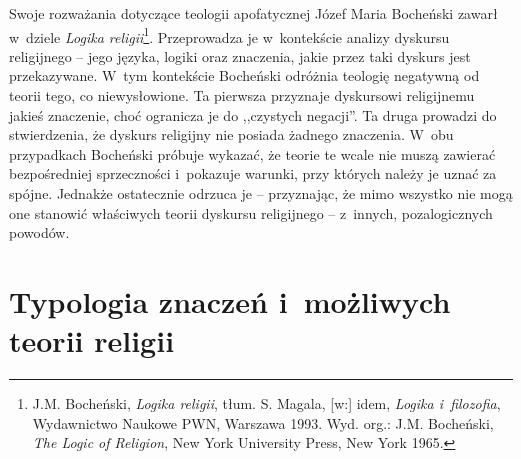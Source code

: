 Swoje rozważania dotyczące teologii apofatycznej Józef Maria Bocheński zawarł w~dziele \textit{Logika religii}\footnote{J.M. Bocheński, \textit{Logika religii}, tłum. S. Magala, [w:] idem, \textit{Logika i~filozofia}, Wydawnictwo Naukowe PWN, Warszawa 1993. Wyd. org.: J.M. Bocheński, \textit{The Logic of Religion}, New York University Press, New York 1965.}. Przeprowadza je w~kontekście analizy dyskursu religijnego -- jego języka, logiki oraz znaczenia, jakie przez taki dyskurs jest przekazywane. W~tym kontekście Bocheński odróżnia teologię negatywną od teorii tego, co niewysłowione. Ta pierwsza przyznaje dyskursowi religijnemu jakieś znaczenie, choć ogranicza je do ,,czystych negacji''. Ta druga prowadzi do stwierdzenia, że dyskurs religijny nie posiada żadnego znaczenia. W~obu przypadkach Bocheński próbuje wykazać, że teorie te wcale nie muszą zawierać bezpośredniej sprzeczności i~pokazuje warunki, przy których należy je uznać za spójne. Jednakże ostatecznie odrzuca je -- przyznając, że mimo wszystko nie mogą one stanowić właściwych teorii dyskursu religijnego -- z~innych, pozalogicznych powodów.


\section{Typologia znaczeń i~możliwych teorii religii}\label{sil-boch-znaczteol}

